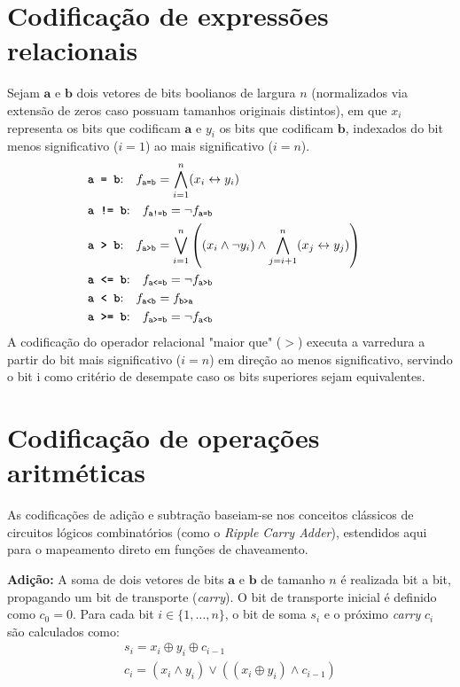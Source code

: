 \documentclass[cic,tc]{infufrgs}
\begin{document}
	\section{Codificação de expressões relacionais}
	\label{sec:cod_rel}
	Sejam $\textbf{a}$ e $\textbf{b}$ dois vetores de bits boolianos de largura $n$ (normalizados via extensão de zeros caso possuam tamanhos originais distintos), em que  $x_i$ representa os bits que codificam $\textbf{a}$ e $y_i$ os bits que codificam $\textbf{b}$, indexados do bit menos significativo ($i=1$) ao mais significativo ($i=n$).
	\begin{align}
		&\text{\texttt{\textbf{a = b}}:} \quad f_{\texttt{a=b}} = \bigwedge_{i=1}^n (x_i \leftrightarrow y_i) &\\
		&\text{\texttt{\textbf{a != b}}:} \quad f_{\texttt{a!=b}} = \neg f_{\texttt{a=b}} &\\
		&\text{\texttt{\textbf{a > b}}:} \quad f_{\texttt{a>b}} = \bigvee_{i=1}^n \left( (x_i \land \neg y_i) \land \bigwedge_{j=i+1}^n (x_j \leftrightarrow y_j) \right) &\\
		&\text{\texttt{\textbf{a <= b}}:} \quad f_{\texttt{a<=b}} = \neg f_{\texttt{a>b}} &\\
		&\text{\texttt{\textbf{a < b}}:} \quad f_{\texttt{a<b}} = f_{\texttt{b>a}} &\\
		&\text{\texttt{\textbf{a >= b}}:} \quad f_{\texttt{a>=b}} = \neg f_{\texttt{a<b}} &
	\end{align}
	A codificação do operador relacional "maior que" ($>$) executa a varredura a partir do bit mais significativo ($i=n$) em direção ao menos significativo, servindo o bit i como critério de desempate caso os bits superiores sejam equivalentes.
	
	\section{Codificação de operações aritméticas}
	\label{sec:cod_arit}
	As codificações de adição e subtração baseiam-se nos conceitos clássicos de circuitos lógicos combinatórios (como o \textit{Ripple Carry Adder}), estendidos aqui para o mapeamento direto em funções de chaveamento.
	
	\vspace{1em}
	\noindent \textbf{Adição:}
	\label{sec:cod_adder}
	A soma de dois vetores de bits $\textbf{a}$ e $\textbf{b}$ de tamanho $n$ é realizada bit a bit, propagando um bit de transporte (\textit{carry}). O bit de transporte inicial é definido como $c_0 = 0$. Para cada bit $i \in \{1, \dots, n\}$, o bit de soma $s_i$ e o próximo \textit{carry} $c_{i}$ são calculados como:
	\begin{align}
		&s_i = x_i \oplus y_i \oplus c_{i-1} &\\
		&c_i = (x_i \land y_i) \lor ((x_i \oplus y_i) \land c_{i-1}) &
	\end{align}
	
\end{document}
